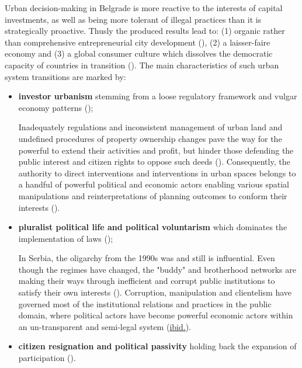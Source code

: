 \documentclass[11pt]{report}
\begin{document}
{{{{Urban decision-making in Belgrade is more reactive to the interests of capital investments, as well as being more tolerant of illegal practices than it is strategically proactive.
Thusly the produced results lead to:
(1) organic rather than comprehensive entrepreneurial city development (\href{Petrovic}{\citealt{petrovic_cities_2009}}),
(2) a laisser-faire economy and
(3) a global consumer culture which dissolves the democratic 
capacity of countries in transition (\href{Ellin}{\citealt{ellin_postmodern_1999}}).
The main characteristics of such urban system transitions  are marked by: 

\begin{itemize}
\item \textbf{investor urbanism} stemming from a loose regulatory framework and vulgar economy patterns (\href{Vujosevic}{\citealt{vujosevic_post-socialist_2010}});

Inadequately regulations and inconsistent management of urban land and undefined procedures of property ownership  changes pave the way for the powerful to extend their activities and profit, but hinder those defending the public interest and citizen rights to oppose such deeds (\href{Vujovic}{\citealt{vujovic_belgrades_2007}}).
Consequently, the authority to direct interventions and interventions in urban spaces belongs to a handful of powerful political and economic actors enabling various spatial manipulations and reinterpretations of planning outcomes to conform their interests (\href{Van}{\citealt{van_assche_co-evolutions_2013}}).

\item \textbf{pluralist political life and political voluntarism} which dominates the implementation of laws (\href{Djokic}{\citealt{djokic_political_2007}});

In Serbia, the oligarchy from the 1990s was and still is influential. Even though the regimes have changed, the "buddy" and brotherhood networks are making their ways through inefficient and corrupt public institutions to satisfy their own interests (\href{Vujovic}{\citealt{vujovic_belgrades_2007}}).
Corruption, manipulation and clientelism have governed most of the institutional relations and practices in the 
public domain, where political actors have become powerful economic actors within an un-transparent and 
semi-legal system (\href{Vujovic}{ibid.}).

\item \textbf{citizen resignation and political passivity} holding back the expansion of participation (\href{Vujovic}{\citealt{vujovic_belgrades_2007}}). 


\end{itemize}}}}}
\end{document}
